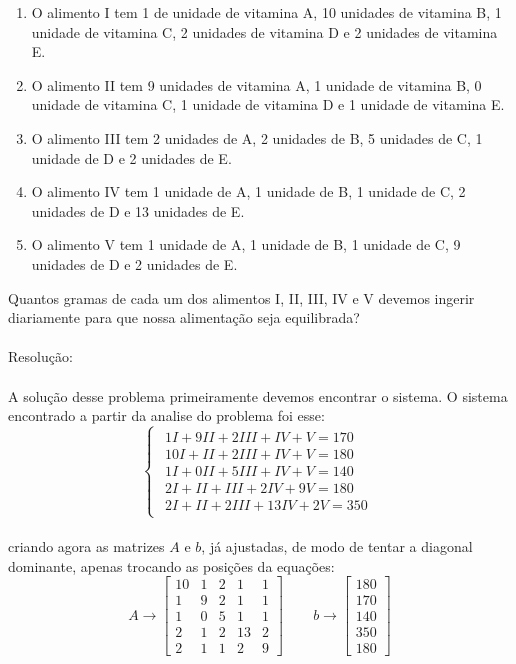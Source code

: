 \documentclass[
	12pt,				%
	openright,			%
	twoside,			%
	a4paper,			%
	english,			%
	french,				%
	spanish,			%
	brazil				%
	]{abntex2_new}
\begin{document}
\begin{enumerate}
	\item{O alimento I tem 1 de unidade de vitamina A, 10 unidades de vitamina B, 1 unidade de vitamina C, 2 unidades 
		de vitamina D e 2 unidades de vitamina E.}
	\item{O alimento II tem 9 unidades de vitamina A, 1 unidade de vitamina B, 0 unidade de vitamina C, 1 unidade de 
	vitamina D e 1 unidade de vitamina E.}
	\item{O alimento III tem 2 unidades de A, 2 unidades de B, 5 unidades de C, 1 unidade de D e 2 unidades de E.}
	\item{O alimento IV tem 1 unidade de A, 1 unidade de B, 1 unidade de C, 2 unidades de D e 13 unidades de E.}
	\item{O alimento V tem 1 unidade de A, 1 unidade de B, 1 unidade de C, 9 unidades de D e 2 unidades de E.}
\end{enumerate}
Quantos gramas de cada um dos alimentos I, II, III, IV e V devemos ingerir diariamente para que nossa alimentação seja
 equilibrada?\\
\\Resolução:\\
\\
A solução desse problema primeiramente devemos encontrar o sistema. O sistema encontrado a partir da analise do problema foi esse:\\
$$\begin{cases}
\begin{aligned}
1I+9II+2III+IV+V=170\\
10I+II+2III+IV+V=180\\
1I+0II+5III+IV+V=140\\
2I+II+III+2IV+9V=180\\
2I+II+2III+13IV+2V=350
\end{aligned}
\end{cases}$$\\
criando agora as matrizes $A$ e $b$, já ajustadas, de modo de tentar a diagonal dominante, apenas trocando as posições da equações:\\
$$	A \rightarrow   \begin{bmatrix}
10 & 1 & 2 & 1 & 1  \\
1 & 9 & 2 & 1 & 1  \\
1 & 0 & 5 & 1 & 1  \\
2 & 1 & 2 & 13 & 2  \\
2 & 1 & 1 & 2 & 9  
\end{bmatrix} \hspace{25pt}
b \rightarrow  \begin{bmatrix}
180\\
170\\
140\\
350\\
180
\end{bmatrix}
$$\\
\end{document}
